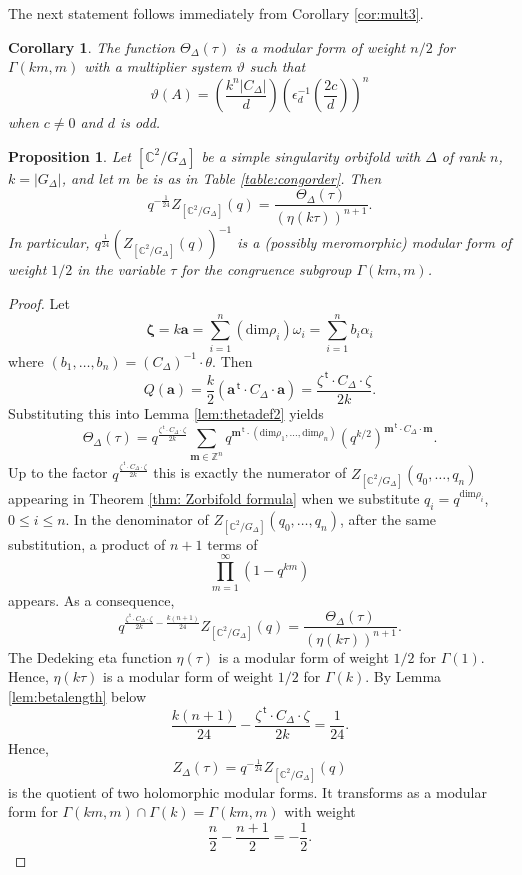 \documentclass{article}
\newtheorem{proposition}[theorem]{Proposition}
\newtheorem{corollary}[theorem]{Corollary}
\theoremstyle{definition}
\newcommand{\CC} {{\mathbb C}}          %
\newcommand{\ZZ} {{\mathbb Z}}		%
\renewcommand{\top}{\,\mathsf{t}}
\begin{document}
The next statement follows immediately from Corollary \ref{cor:mult3}.
\begin{corollary}
\label{cor:thetazetamult} 
The function $\Theta_{\Delta}(\tau)$ is a modular form of weight $n/2$ for 
$\Gamma(km,m)$ with a multiplier system $\vartheta$ such that
\[ \vartheta(A)=\left(\frac{k^n|C_{\Delta}|}{d}\right)
\left(\epsilon^{-1}_d \left(\frac{2c}{d}\right)\right)^n \]
when $c\neq 0$ and $d$ is odd.
\end{corollary}


\begin{proposition}
	\label{prop:locmod}
	Let $[\CC^2/G_\Delta]$ be a simple singularity orbifold with $\Delta$ of rank $n$, $k=|G_\Delta|$, and
let $m$ be is as in Table \ref{table:congorder}. 
	Then 
\[q^{-\frac{1}{24}}Z_{[\CC^2/G_\Delta]}(q)=\frac{\Theta_{\Delta}(\tau)}{(\eta(k\tau))^{n+1}}.\] 
In particular, $q^{\frac{1}{24}}(Z_{[\CC^2/G_\Delta]}(q))^{-1}$ is a (possibly meromorphic) modular form of weight $1/2$ in the variable $\tau$ for the congruence subgroup $\Gamma(km,m)$.
\end{proposition}
\begin{proof}
Let
\begin{equation}\mathbf{\zeta}= k\mathbf{a}=\sum_{i=1}^n (\mathrm{dim} \rho_i) 
\omega_i=\sum_{i=1}^n b_i \alpha_i
\label{eq:zetasub}
\end{equation}
where $(b_1,\dots,b_n)=(C_\Delta)^{-1} \cdot \theta$.
Then
\[ Q(\mathbf{a})=\frac{k}{2}\left(\mathbf{a}^ {\top} \cdot C_\Delta 
\cdot \mathbf{a}\right)=  \frac{\zeta^ {\top} \cdot C_\Delta \cdot \zeta}{2k}. \]
Substituting this into Lemma \ref{lem:thetadef2} yields
\begin{equation*} 
\Theta_{ \Delta }(\tau )= q^{\frac{\zeta^ {\top} \cdot C_\Delta \cdot \zeta}{2k}}
\sum_{ \mathbf{m} \in  \ZZ^n } q^{\mathbf{m}^ {\top} \cdot 
( \mathrm{dim} \rho_1 ,\dots, \mathrm{dim} \rho_n) } 
(q^{k/2})^{\mathbf{m}^ {\top} \cdot C_\Delta \cdot \mathbf{m}}
. 
\end{equation*}
Up to the factor $q^{ \frac{\zeta^ {\top} \cdot C_\Delta \cdot \zeta}{2k}}$ this is exactly 
the numerator of $Z_{[ \CC^2/G_\Delta]}(q_0,\dots,q_n)$ appearing in Theorem 
\ref{thm: Zorbifold formula} when we substitute $q_i=q^{\mathrm{dim} \rho_i}$, $0 \leq i \leq n$. In 
the denominator of $Z_{[ \CC^2/G_\Delta]}(q_0,\dots,q_n)$, after the same substitution, a 
product of $n+1$ terms of 
\[\prod_{m=1}^{\infty}(1-q^{km})\] 
appears. As a consequence,
\[ q^{\frac{\zeta^ {\top} \cdot C_\Delta \cdot \zeta}{2k} - \frac{k(n+1)}{24}}
Z_{[ \CC^2/G_\Delta]}(q)  = 
\frac{\Theta_{\Delta}(\tau )}{(\eta(k\tau))^{n+1}}. \]
The Dedeking eta function $\eta(\tau)$ is a modular form of weight $1/2$ for $\Gamma(1)$. 
Hence, $\eta(k\tau)$ is a modular form of weight $1/2$ for $\Gamma(k)$.
By Lemma \ref{lem:betalength} below
\[ \frac{k(n+1)}{24} - \frac{\zeta^ {\top} \cdot C_\Delta \cdot \zeta}{2k}=\frac{1}{24}. \]
Hence,
\[ Z_{\Delta}(\tau)=q^{-\frac{1}{24}}Z_{[ \CC^2/G_\Delta]}(q)
 \]
is the quotient of two holomorphic modular forms. It transforms as a modular form for 
$\Gamma(km,m)\cap \Gamma(k)=\Gamma(km,m)$ with weight 
\[\frac{n}{2}- \frac{n+1}{2}=-\frac{1}{2}. \]
\end{proof}
\end{document}
